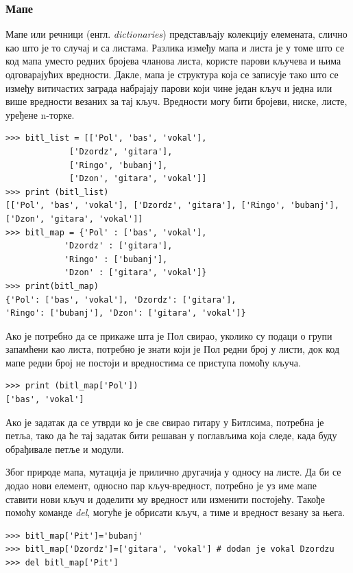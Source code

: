 \subsubsection{Мапе}\label{subsec:maps}
Мапе или речници (енгл. \emph{dictionaries}) представљају колекцију елемената, слично као што је то случај и са листама. Разлика између мапа и листа је у томе што се код мапа уместо редних бројева чланова листа, користе парови кључева и њима одговарајућих вредности. Дакле, мапа је структура која се записује тако што се између витичастих заграда набрајају парови који чине један кључ и једна или више вредности везаних за тај кључ. Вредности могу бити бројеви, ниске, листе, уређене n-торке.

\begin{lstlisting}[caption = Разлика између листе и мапе, label = map_vs_list]
>>> bitl_list = [['Pol', 'bas', 'vokal'],
	         ['Dzordz', 'gitara'],
	         ['Ringo', 'bubanj'],
	         ['Dzon', 'gitara', 'vokal']]
>>> print (bitl_list)
[['Pol', 'bas', 'vokal'], ['Dzordz', 'gitara'], ['Ringo', 'bubanj'],
['Dzon', 'gitara', 'vokal']]
>>> bitl_map = {'Pol' : ['bas', 'vokal'],
	        'Dzordz' : ['gitara'],
	        'Ringo' : ['bubanj'],
	        'Dzon' : ['gitara', 'vokal']}
>>> print(bitl_map)
{'Pol': ['bas', 'vokal'], 'Dzordz': ['gitara'],
'Ringo': ['bubanj'], 'Dzon': ['gitara', 'vokal']}
\end{lstlisting}

Ако је потребно да се прикаже шта је Пол свирао, уколико су подаци о групи запамћени као листа, потребно је знати који је Пол редни број у листи, док код мапе редни број не постоји и вредностима се приступа помоћу кључа.

\begin{lstlisting}[caption = Кључ и вредност, label = key_value]
>>> print (bitl_map['Pol'])
['bas', 'vokal']
\end{lstlisting}

Ако је задатак да се утврди ко је све свирао гитару у Битлсима, потребна је петља, тако да ће тај задатак бити решаван у поглављима која следе, када буду обрађивале петље и модули.

Због природе мапа, мутација је прилично другачија у односу на листе. Да би се додао нови елемент, односно пар кључ-вредност, потребно је уз име мапе ставити нови кључ и доделити му вредност или изменити постојећу. Такође помоћу команде \emph{del}, могуће је обрисати кључ, а тиме и вредност везану за њега.

\begin{lstlisting}[caption = Мутација мапа, label = mutacija_mapa]
>>> bitl_map['Pit']='bubanj'
>>> bitl_map['Dzordz']=['gitara', 'vokal'] # dodan je vokal Dzordzu
>>> del bitl_map['Pit']
\end{lstlisting}

